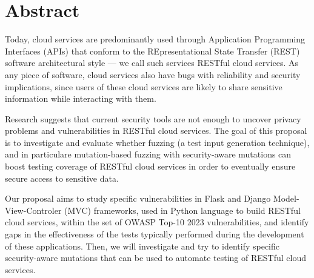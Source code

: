 \chapter*{Abstract}
%

Today, cloud services are predominantly used through Application Programming Interfaces (APIs) that conform to the
REpresentational State Transfer (REST) software architectural style --- we call such services RESTful cloud services.
As any piece of software, cloud services also have bugs with reliability and security implications, since
users of these cloud services are likely to share sensitive information while interacting with them.

Research suggests that current security tools are not enough to uncover privacy problems and vulnerabilities in RESTful cloud services.
The goal of this proposal is to investigate and evaluate whether fuzzing (a test input generation technique), and in particulare
mutation-based fuzzing with security-aware mutations can boost testing coverage of RESTful cloud services in order to eventually
 ensure secure access to sensitive data.

Our proposal aims to study specific vulnerabilities in Flask and Django Model-View-Controler (MVC) frameworks, used in
Python language to build RESTful cloud services, within the set of OWASP Top-10 2023 vulnerabilities, 
and identify gaps in the effectiveness of the tests typically performed during the development of these applications.
Then, we will investigate and try to identify specific security-aware mutations that can be used to automate testing of RESTful cloud services.

